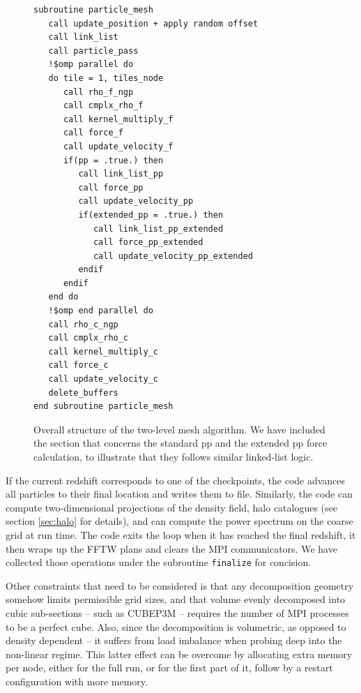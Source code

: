 \documentclass[useAMS,usenatbib]{mn2e}
\begin{document}
\begin{figure}
\begin{verbatim}
subroutine particle_mesh
   call update_position + apply random offset
   call link_list
   call particle_pass
   !$omp parallel do
   do tile = 1, tiles_node
      call rho_f_ngp
      call cmplx_rho_f
      call kernel_multiply_f
      call force_f
      call update_velocity_f
      if(pp = .true.) then       
         call link_list_pp
         call force_pp
         call update_velocity_pp
         if(extended_pp = .true.) then
            call link_list_pp_extended
            call force_pp_extended
            call update_velocity_pp_extended       
         endif
      endif
   end do
   !$omp end parallel do
   call rho_c_ngp
   call cmplx_rho_c
   call kernel_multiply_c
   call force_c
   call update_velocity_c      
   delete_buffers
end subroutine particle_mesh
\end{verbatim}
\caption{Overall structure of the two-level mesh algorithm. We have included the section that concerns the standard pp and the extended pp force calculation, to illustrate that they follows similar linked-list logic. }
\label{fig:particle_mesh}
\end{figure}


If the current redshift corresponds to one of the checkpoints, the code advances all particles to their final location
and writes them to file. Similarly, the code can compute two-dimensional projections of the density field, halo catalogues (see section \ref{sec:halo} for details), and can compute the power spectrum on the coarse grid at run time. 
The code exits the loop when it has reached the final redshift, it then wraps up the {\small FFTW} plans 
and clears the {\small MPI} communicators. We have collected those operations under the subroutine {\tt finalize} for concision.

Other constraints that need to be considered is that any decomposition geometry somehow 
limits permissible grid sizes, and that volume evenly decomposed into cubic sub-sections 
--  such as {\small CUBEP3M} -- requires the number of {\small MPI} processes to be a perfect cube.
Also,  since the decomposition is volumetric, as opposed to density dependent -- 
it suffers from load imbalance when probing deep into the non-linear regime.
This latter effect can be overcome by allocating extra memory per node, either for the full run,
or for the first part of it, follow by a restart configuration with more memory.

%
\end{document}
